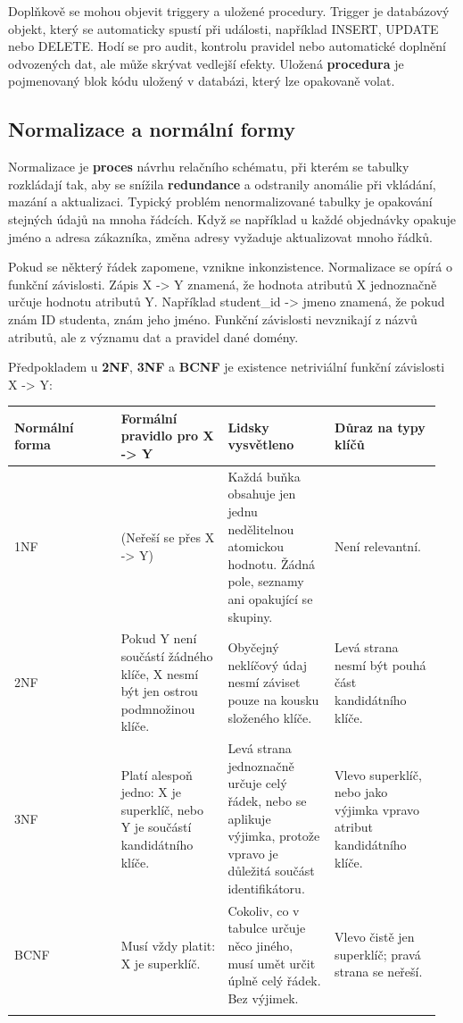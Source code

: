 \documentclass[11pt,a4paper]{article}
\begin{document}
Doplňkově se mohou objevit triggery a uložené procedury. Trigger je databázový objekt, který se automaticky spustí při události, například INSERT, UPDATE nebo DELETE. Hodí se pro audit, kontrolu pravidel nebo automatické doplnění odvozených dat, ale může skrývat vedlejší efekty. Uložená \textbf{procedura} je pojmenovaný blok kódu uložený v databázi, který lze opakovaně volat.

\subsection*{Normalizace a normální formy}

Normalizace je \textbf{proces} návrhu relačního schématu, při kterém se tabulky rozkládají tak, aby se snížila \textbf{redundance} a odstranily anomálie při vkládání, mazání a aktualizaci. Typický problém nenormalizované tabulky je opakování stejných údajů na mnoha řádcích. Když se například u každé objednávky opakuje jméno a adresa zákazníka, změna adresy vyžaduje aktualizovat mnoho řádků.

Pokud se některý řádek zapomene, vznikne inkonzistence. Normalizace se opírá o funkční závislosti. Zápis X -> Y znamená, že hodnota atributů X jednoznačně určuje hodnotu atributů Y. Například student\_id -> jmeno znamená, že pokud znám ID studenta, znám jeho jméno. Funkční závislosti nevznikají z názvů atributů, ale z významu dat a pravidel dané domény.

Předpokladem u \textbf{2NF}, \textbf{3NF} a \textbf{BCNF} je existence netriviální funkční závislosti X -> Y:

\begin{longtable}{p{0.237\linewidth}p{0.237\linewidth}p{0.237\linewidth}p{0.237\linewidth}}
\toprule
\textbf{Normální forma} & \textbf{Formální pravidlo pro X -> Y} & \textbf{Lidsky vysvětleno} & \textbf{Důraz na typy klíčů} \\
\midrule\endhead
1NF & (Neřeší se přes X -> Y) & Každá buňka obsahuje jen jednu nedělitelnou atomickou hodnotu. Žádná pole, seznamy ani opakující se skupiny. & Není relevantní. \\
\addlinespace
2NF & Pokud Y není součástí žádného klíče, X nesmí být jen ostrou podmnožinou klíče. & Obyčejný neklíčový údaj nesmí záviset pouze na kousku složeného klíče. & Levá strana nesmí být pouhá část kandidátního klíče. \\
\addlinespace
3NF & Platí alespoň jedno: X je superklíč, nebo Y je součástí kandidátního klíče. & Levá strana jednoznačně určuje celý řádek, nebo se aplikuje výjimka, protože vpravo je důležitá součást identifikátoru. & Vlevo superklíč, nebo jako výjimka vpravo atribut kandidátního klíče. \\
\addlinespace
BCNF & Musí vždy platit: X je superklíč. & Cokoliv, co v tabulce určuje něco jiného, musí umět určit úplně celý řádek. Bez výjimek. & Vlevo čistě jen superklíč; pravá strana se neřeší. \\
\addlinespace
\bottomrule
\end{longtable}
\end{document}
